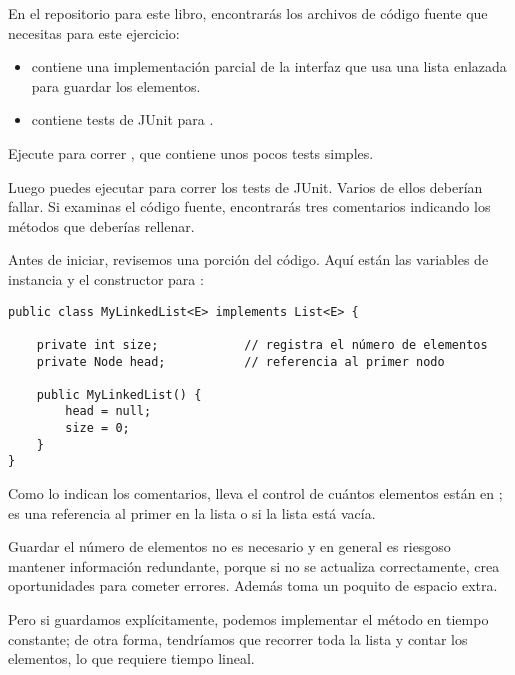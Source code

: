 \documentclass[12pt]{book}
\theoremstyle{exercise}
\begin{document}
En el repositorio para este libro, encontrarás los archivos
de código fuente que necesitas para este ejercicio:


\begin{itemize}

\item {} contiene una implementación parcial de
  la interfaz  que usa una lista enlazada para guardar los elementos.

\item {} contiene tests de JUnit para
  .

\end{itemize}

Ejecute  para correr , que
contiene unos pocos tests simples. 

Luego puedes ejecutar  para correr los tests de JUnit.
Varios de ellos deberían fallar. Si examinas el código fuente, encontrarás
tres comentarios  indicando los métodos que deberías rellenar.

Antes de iniciar, revisemos una porción del
código. Aquí están las variables de instancia y el constructor para
:

\begin{verbatim}
public class MyLinkedList<E> implements List<E> {

    private int size;            // registra el número de elementos
    private Node head;           // referencia al primer nodo

    public MyLinkedList() {
        head = null;
        size = 0;
    }
}
\end{verbatim}

Como lo indican los comentarios,  lleva el control de cuántos elementos
están en ;  es una referencia al primer
 en la lista o  si la lista está vacía.


Guardar el número de elementos no es necesario y en general es
riesgoso mantener información redundante, porque si no se actualiza
correctamente, crea oportunidades para cometer errores. Además
toma un poquito de espacio extra.


Pero si guardamos  explícitamente, podemos implementar el
método  en tiempo constante; de otra forma, tendríamos que
recorrer toda la lista y contar los elementos, lo que requiere tiempo lineal.
\end{document}
